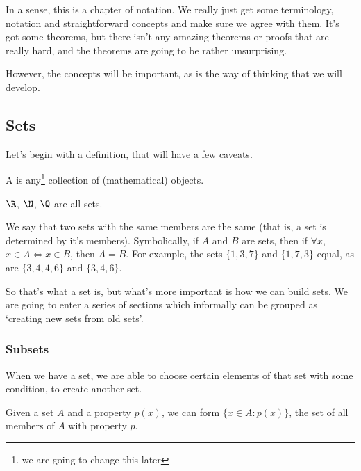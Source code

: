 In a sense, this is a chapter of notation. We really just get some terminology, notation and straightforward concepts and make sure we agree with them. It's got some theorems, but there isn't any amazing theorems or proofs that are really hard, and the theorems are going to be rather unsurprising.

However, the concepts will be important, as is the way of thinking that we will develop.

\subsection{Sets}

Let's begin with a definition, that will have a few caveats.

\begin{definition}[Set]
A  is any\footnote{we are going to change this later} collection of (mathematical) objects.
\end{definition}

\begin{example}
	$\R$, $\N$, $\Q$ are all sets.
\end{example}

We say that two sets with the same members are the same (that is, a set is determined by it's members).
Symbolically, if $A$ and $B$ are sets, then if $\forall x$, $x \in A \iff x \in B$, then $A = B$.
 For example, the sets $\{1, 3, 7 \}$ and $\{1, 7, 3\}$ equal, as are $\{3, 4, 4, 6\} $ and $\{3, 4, 6\}$.



So that's what a set is, but what's more important is how we can build sets. We are going to enter a series of sections which informally can be grouped as `creating new sets from old sets'.

\subsubsection{Subsets}

When we have a set, we are able to choose certain elements of that set with some condition, to create another set.


\begin{axiom}
	Given a set $A$ and a property $p(x)$, we can form $\{x \in A : p(x)\}$, the set of all members of $A$ with property $p$.
\end{axiom}


